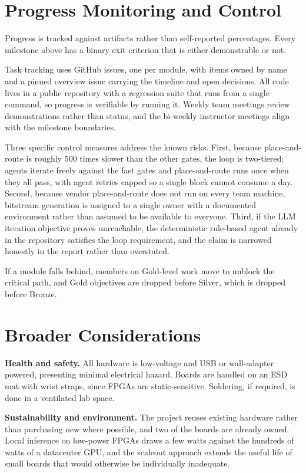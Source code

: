 \documentclass[conference,10pt]{IEEEtran}
\begin{document}
\section{Progress Monitoring and Control}\label{sec:monitor}
Progress is tracked against artifacts rather than self-reported percentages. Every
milestone above has a binary exit criterion that is either demonstrable or not.

Task tracking uses GitHub issues, one per module, with items owned by name and a
pinned overview issue carrying the timeline and open decisions. All code lives in a
public repository with a regression suite that runs from a single command, so
progress is verifiable by running it. Weekly team meetings review demonstrations
rather than status, and the bi-weekly instructor meetings align with the milestone
boundaries.

Three specific control measures address the known risks. First, because
place-and-route is roughly 500 times slower than the other gates, the loop is
two-tiered: agents iterate freely against the fast gates and place-and-route runs
once when they all pass, with agent retries capped so a single block cannot consume
a day. Second, because vendor place-and-route does not run on every team machine,
bitstream generation is assigned to a single owner with a documented environment
rather than assumed to be available to everyone. Third, if the LLM iteration
objective proves unreachable, the deterministic rule-based agent already in the
repository satisfies the loop requirement, and the claim is narrowed honestly in
the report rather than overstated.

If a module falls behind, members on Gold-level work move to unblock the critical
path, and Gold objectives are dropped before Silver, which is dropped before
Bronze.

\section{Broader Considerations}
\textbf{Health and safety.} All hardware is low-voltage and USB or wall-adapter
powered, presenting minimal electrical hazard. Boards are handled on an ESD mat
with wrist straps, since FPGAs are static-sensitive. Soldering, if required, is
done in a ventilated lab space.

\textbf{Sustainability and environment.} The project reuses existing hardware
rather than purchasing new where possible, and two of the boards are already owned.
Local inference on low-power FPGAs draws a few watts against the hundreds of watts
of a datacenter GPU, and the scaleout approach extends the useful life of small
boards that would otherwise be individually inadequate.
\end{document}
